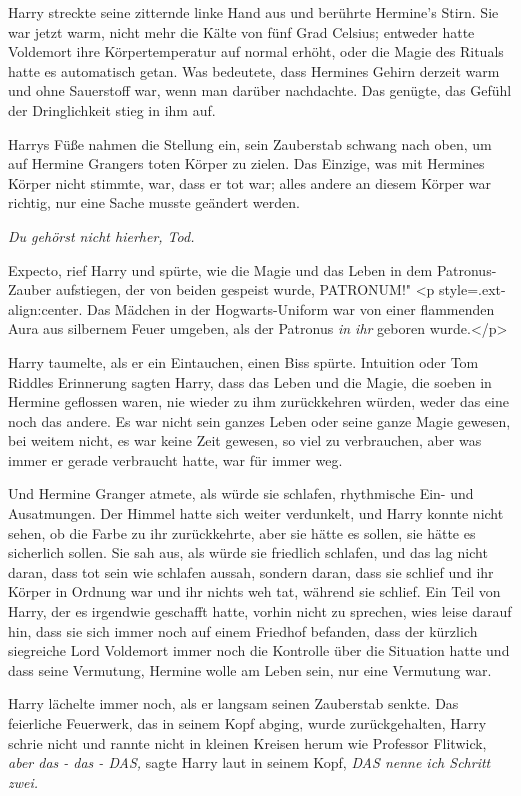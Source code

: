 Harry streckte seine zitternde linke Hand aus und berührte Hermine's Stirn. Sie
war jetzt warm, nicht mehr die Kälte von fünf Grad Celsius; entweder hatte
Voldemort ihre Körpertemperatur auf normal erhöht, oder die Magie des Rituals
hatte es automatisch getan. Was bedeutete, dass Hermines Gehirn derzeit warm und
ohne Sauerstoff war, wenn man darüber nachdachte. Das genügte, das Gefühl der
Dringlichkeit stieg in ihm auf.

Harrys Füße nahmen die Stellung ein, sein Zauberstab schwang nach oben, um auf
Hermine Grangers toten Körper zu zielen. Das Einzige, was mit Hermines Körper
nicht stimmte, war, dass er tot war; alles andere an diesem Körper war richtig,
nur eine Sache musste geändert werden.

\emph{Du gehörst nicht hierher, Tod.}

\glqq Expecto\grqq{}, rief Harry und spürte, wie die Magie und das Leben in dem
Patronus-Zauber aufstiegen, der von beiden gespeist wurde, \glqq PATRONUM!" <p
style=\grqq{}.ext-align:center\grqq{}. Das Mädchen in der Hogwarts-Uniform war
von einer flammenden Aura aus silbernem Feuer umgeben, als der Patronus\emph{ in
ihr} geboren wurde.</p>

Harry taumelte, als er ein Eintauchen, einen Biss spürte. Intuition oder Tom
Riddles Erinnerung sagten Harry, dass das Leben und die Magie, die soeben in
Hermine geflossen waren, nie wieder zu ihm zurückkehren würden, weder das eine
noch das andere. Es war nicht sein ganzes Leben oder seine ganze Magie gewesen,
bei weitem nicht, es war keine Zeit gewesen, so viel zu verbrauchen, aber was
immer er gerade verbraucht hatte, war für immer weg.

Und Hermine Granger atmete, als würde sie schlafen, rhythmische Ein- und
Ausatmungen. Der Himmel hatte sich weiter verdunkelt, und Harry konnte nicht
sehen, ob die Farbe zu ihr zurückkehrte, aber sie hätte es sollen, sie hätte es
sicherlich sollen. Sie sah aus, als würde sie friedlich schlafen, und das lag
nicht daran, dass tot sein wie schlafen aussah, sondern daran, dass sie schlief
und ihr Körper in Ordnung war und ihr nichts weh tat, während sie schlief. Ein
Teil von Harry, der es irgendwie geschafft hatte, vorhin nicht zu sprechen, wies
leise darauf hin, dass sie sich immer noch auf einem Friedhof befanden, dass der
kürzlich siegreiche Lord Voldemort immer noch die Kontrolle über die Situation
hatte und dass seine Vermutung, Hermine wolle am Leben sein, nur eine Vermutung
war.

Harry lächelte immer noch, als er langsam seinen Zauberstab senkte. Das
feierliche Feuerwerk, das in seinem Kopf abging, wurde zurückgehalten, Harry
schrie nicht und rannte nicht in kleinen Kreisen herum wie Professor Flitwick,
\emph{aber das - das - DAS,} sagte Harry laut in seinem Kopf,\emph{ DAS nenne
ich Schritt zwei.}

